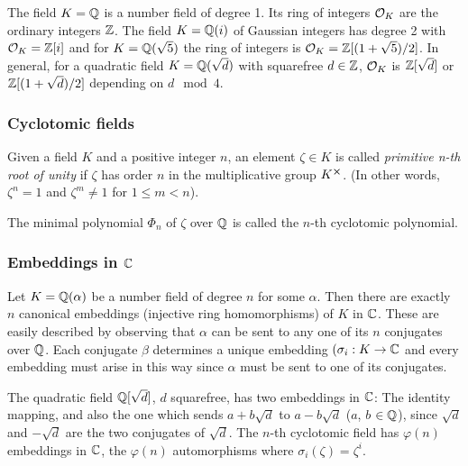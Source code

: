 \begin{example}
    The field $K = \mathbb{Q}$ is a number field of degree 1. Its ring of integers $\mathcal{O}_K$ are the ordinary integers $\mathbb{Z}$. The field $K = \mathbb{Q}(i)$ of Gaussian integers has degree 2 with $\mathcal{O}_K = \mathbb{Z}[i]$ and for $K = \mathbb{Q}(\sqrt{5})$ the ring of integers is $\mathcal{O}_K = \mathbb{Z}[(1 + \sqrt{5})/2]$. In general, for a quadratic field $K = \mathbb{Q}(\sqrt{d})$ with squarefree $d \in \mathbb{Z}$, $\mathcal{O}_K$ is $\mathbb{Z}[\sqrt{d}]$ or $\mathbb{Z}[(1 + \sqrt{d})/2]$ depending on $d \mod 4$.
\end{example}

\subsubsection*{Cyclotomic fields}

\begin{definition}
    Given a field $K$ and a positive integer $n$, an element $\zeta \in K$ is called \textit{primitive n-th root of unity} if $\zeta$ has order $n$ in the multiplicative group $K^{\cross}$. (In other words, $\zeta^n = 1$ and $\zeta^m \neq 1$ for $1 \leq m < n$).
\end{definition}

The minimal polynomial $\Phi_n$ of $\zeta$ over $\mathbb{Q}$ is called the $n$-th cyclotomic polynomial.

\subsubsection*{Embeddings in $\mathbb{C}$}
Let $K = \mathbb{Q}(\alpha)$ be a number field of degree $n$ for some $\alpha$. Then there are exactly $n$ canonical embeddings (injective ring homomorphisms) of $K$ in $\mathbb{C}$. These are easily described by observing that $\alpha$ can be sent to any one of its $n$ conjugates over $\mathbb{Q}$. Each conjugate $\beta$ determines a unique embedding $(\sigma_i: K \rightarrow \mathbb{C}$ and every embedding must arise in this way since $\alpha$ must be sent to one of its conjugates.

\begin{example}
    The quadratic field $\mathbb{Q}[\sqrt{d}]$, $d$ squarefree, has two embeddings in $\mathbb{C}$: The identity mapping, and also the one which sends $a + b\sqrt{d}$ to $a - b\sqrt{d}$ ($a$, $b$ $\in \mathbb{Q}$), since $\sqrt{d}$ and $-\sqrt{d}$ are the two conjugates of $\sqrt{d}$. The $n$-th cyclotomic field has $\varphi(n)$ embeddings in $\mathbb{C}$, the $\varphi(n)$ automorphisms where $\sigma_i(\zeta) = \zeta^i$.
\end{example}

